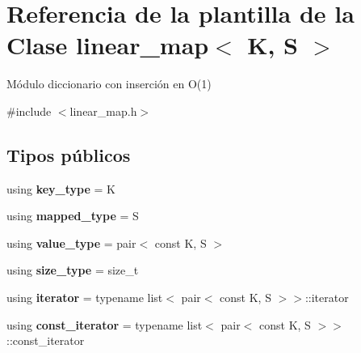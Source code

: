 \hypertarget{classlinear__map}{\section{Referencia de la plantilla de la Clase linear\-\_\-map$<$ K, S $>$}
\label{classlinear__map}
}


Módulo diccionario con inserción en O(1)  




{\ttfamily \#include $<$linear\-\_\-map.\-h$>$}

\subsection*{Tipos públicos}
\begin{DoxyCompactItemize}
\item 
\hypertarget{classlinear__map_a85577f6aa54870bf9b5d2f85f0749078}{using {\bfseries key\-\_\-type} = K}\label{classlinear__map_a85577f6aa54870bf9b5d2f85f0749078}

\item 
\hypertarget{classlinear__map_aaed4a6810a4a46c0cede18821069cc65}{using {\bfseries mapped\-\_\-type} = S}\label{classlinear__map_aaed4a6810a4a46c0cede18821069cc65}

\item 
\hypertarget{classlinear__map_a8bf7640c132d7e6fa5c4e68e1623d27d}{using {\bfseries value\-\_\-type} = pair$<$ const K, S $>$}\label{classlinear__map_a8bf7640c132d7e6fa5c4e68e1623d27d}

\item 
\hypertarget{classlinear__map_a08095dfd88596e72f10d59a212b622f8}{using {\bfseries size\-\_\-type} = size\-\_\-t}\label{classlinear__map_a08095dfd88596e72f10d59a212b622f8}

\item 
\hypertarget{classlinear__map_a26639947def2ce8549cde3fdd31bd42e}{using {\bfseries iterator} = typename list$<$ pair$<$ const K, S $>$$>$\-::iterator}\label{classlinear__map_a26639947def2ce8549cde3fdd31bd42e}

\item 
\hypertarget{classlinear__map_ae4a408774a63cf33acbb0397b64972e5}{using {\bfseries const\-\_\-iterator} = typename list$<$ pair$<$ const K, S $>$$>$\-::const\-\_\-iterator}\label{classlinear__map_ae4a408774a63cf33acbb0397b64972e5}

\end{DoxyCompactItemize}
